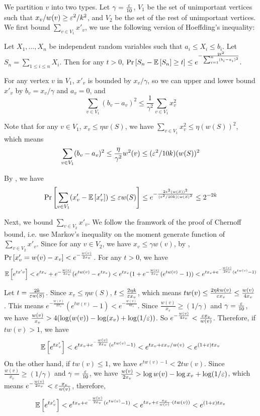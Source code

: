 We partition $v$ into two types. Let $\gamma = \frac{{\varepsilon}}{10}$, $V_1$ be the set of unimportant vertices such that $x_v/w(v) \ge {\varepsilon}^2/k^2$, and $V_2$ be the set of the rest of unimportant vertices. We first bound $\sum_{v \in V_1} x'_v$, we use the following version of Hoeffding's inequality:

\begin{claim} \label{hoeffding}
    Let $X_1,\dots,X_n$ be independent random variables such that $a_i \le X_i \le b_i$. Let $S_n = \sum_{1\le  i\le n}X_i$. Then for any $t>0$,
    $\mathrm{Pr}\left[ S_n - {\mathbb{E}}\left[ S_n \right] \ge t \right] \le e^{-\frac{2t^2}{\sum_{i=1}^n(b_i-a_i)^2}}.
    $
\end{claim}

For any vertex $v$ in $V_1$, $x'_v$ is bounded by $x_v/\gamma$, so we can upper and lower bound $x'_v$ by $b_v = x_v/\gamma$ and $a_v=0$, and 
$$
    \sum_{v\in V_1} (b_v-a_v)^2 \le \frac{1}{\gamma^2} \sum_{v\in V_1} x^2_v
$$

Note that for any $v \in V_1$, $x_v \le \eta w(S)$, we have $\sum_{v\in V_1} x^2_v \le \eta (w(S))^2$, which means 
$$
    \sum_{v\in V_1} (b_v-a_v)^2 \le \frac{\eta}{\gamma^2} w^2(v) \le ({\varepsilon}^2/10k) (w(S))^2
$$

By , we have 
$$
    \mathrm{Pr}\left[ \sum_{v \in V_1} (x'_v - {\mathbb{E}}\left[ x'_v \right]) \le {\varepsilon} w(S) \right] \le e^{-\frac{2{\varepsilon}^2 (w(S))^2}{({\varepsilon}^2/10k)(w(S)^2}} \le 2^{-2k}
$$

Next, we bound $\sum_{v \in V_2} x'_v$. We follow the framwork of the proof of Chernoff bound, i.e. use Markov's inequality on the moment generate function of $
\sum_{v \in V_2} x'_v$. Since for any $v \in V_2$, we have $x_v \le \gamma w(v)$, by , $\mathrm{Pr}\left[ x'_v = w(v)-x_v \right] < e^{-\frac{w(v)}{2x_v}}$. For any $t>0$, we have 
\begin{align*}
    {\mathbb{E}}\left[ e^{tx'v} \right] < e^{tx_v} + e^{-\frac{w(v)}{2x_v}}(e^{tw(v)}-e^{tx_v}) < e^{tx_v}(1+e^{-\frac{w(v)}{2x_v}}(e^{tw(v)}-1)) < e^{tx_v + e^{-\frac{w(v)}{2x_v}}(e^{tw(v)}-1)}
\end{align*}

Let $t = \frac{2k}{{\varepsilon} w(S)}$. Since $x_v \le \eta w(S)$, $t \le \frac{2 \eta k}{{\varepsilon} x_v}$, which means $tw(v) \le \frac{2\eta k w(v)}{{\varepsilon} x_v} \le \frac{w(v)}{4x_v}$. This means $e^{-\frac{w(v)}{2x_v}}(e^{tw(v)}-1)< e^{-\frac{w(v)}{4x_v}}$. Since $\frac{w(v)}{x_v} \ge (1/\gamma)$ and $\gamma=\frac{{\varepsilon}}{10}$, we have $\frac{w(v)}{x_v}>4( \log (w(v))-\log(x_v) + \log (1/{\varepsilon}))$. So $e^{-\frac{w(v)}{4x_v}}<\frac{{\varepsilon} x_v}{w(v)}$. Therefore, if $tw(v) > 1$, we have 
$$
    {\mathbb{E}}\left[ e^{tx'_v} \right]<e^{tx_v + e^{-\frac{w(v)}{2x_v}}(e^{tw(v)}-1)}<e^{tx_v + {\varepsilon} x_v/w(v)}<e^{(1+{\varepsilon})tx_v}
$$
On the other hand, if $tw(v) \le 1$, we have $e^{tw(v)-1} < 2tw(v)$. Since $\frac{w(v)}{x_v} \ge (1/\gamma)$ and $\gamma=\frac{{\varepsilon}}{10}$, we have $\frac{w(v)}{2x_v} > \log w(v) - \log x_v + \log (1/{\varepsilon})$, which means $e^{-\frac{w(v)}{2x_v}}<{\varepsilon}\frac{x_v}{w(v)}$, therefore,
$$
    {\mathbb{E}}\left[ e^{tx'_v} \right]<e^{tx_v + e^{-\frac{w(v)}{2x_v}}(e^{tw(v)}-1)}<e^{tx_v + {\varepsilon}\frac{x_v}{w(v)} \cdot (tw(v))} < e^{(1+{\varepsilon})tx_v}
$$

